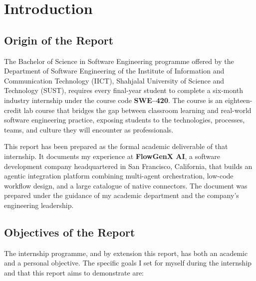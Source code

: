 \chapter{Introduction}
\label{ch:introduction}

\section{Origin of the Report}
The Bachelor of Science in Software Engineering programme offered by the
Department of Software Engineering of the Institute of Information and
Communication Technology (IICT), Shahjalal University of Science and
Technology (SUST), requires every final-year student to complete a
six-month industry internship under the course code \textbf{SWE--420}.
The course is an eighteen-credit lab course that bridges the gap between
classroom learning and real-world software engineering practice,
exposing students to the technologies, processes, teams, and culture
they will encounter as professionals.

This report has been prepared as the formal academic deliverable of that
internship. It documents my experience at \textbf{FlowGenX AI}, a
software development company headquartered in San Francisco, California,
that builds an agentic integration platform combining multi-agent
orchestration, low-code workflow design, and a large catalogue of native
connectors. The document was prepared under the guidance of my academic
department and the company's engineering leadership.

\section{Objectives of the Report}
The internship programme, and by extension this report, has both an
academic and a personal objective. The specific goals I set for myself
during the internship and that this report aims to demonstrate are:

